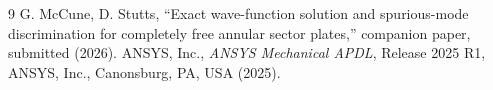 \documentclass[11pt]{article}
\begin{document}
\begin{thebibliography}{9}\small
{} G. McCune, D. Stutts, ``Exact wave-function
solution and spurious-mode discrimination for completely free annular sector
plates,'' companion paper, submitted (2026).
 ANSYS, Inc., \emph{ANSYS Mechanical APDL}, Release 2025 R1,
ANSYS, Inc., Canonsburg, PA, USA (2025).
\end{thebibliography}
\end{document}
